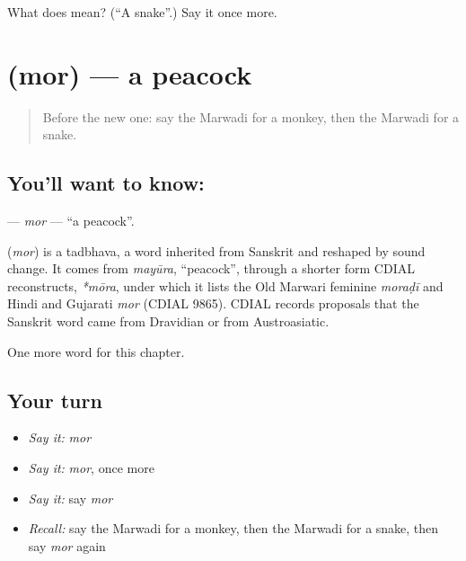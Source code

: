 \begin{tcolorbox}[breakable,colback=teal!4,colframe=teal!35!black,title={Before you move on}]
What does  mean? (\textquotedblleft{}A snake\textquotedblright{}.) Say it once more.
\end{tcolorbox}
\section[\texorpdfstring{\mw{मोर} (mor)}{मोर (mor)}]{ (mor) — a peacock}

\label{lesson:MW-C72-mor}



\begin{quote}
Before the new one: say the Marwadi for a monkey, then the Marwadi for a snake.
\end{quote}

\subsection*{You'll want to know: }
\textbf{} — \emph{mor} — \textquotedblleft{}a peacock\textquotedblright{}.

\begin{cousinweb}
\textbf{} (\emph{mor}) is a tadbhava, a word inherited from Sanskrit and reshaped by sound change. It comes from \emph{mayūra}, \textquotedblleft{}peacock\textquotedblright{}, through a shorter form CDIAL reconstructs, \emph{*mōra}, under which it lists the Old Marwari feminine \emph{moraḍī} and Hindi and Gujarati \emph{mor} (CDIAL 9865). CDIAL records proposals that the Sanskrit word came from Dravidian or from Austroasiatic.
\end{cousinweb}

\begin{grammarlens}[title={What you've built}]
One more word for this chapter.
\end{grammarlens}

\subsection*{Your turn}
\begin{itemize}
\raggedright
  \item \emph{Say it:} \emph{mor}
  \item \emph{Say it:} \emph{mor}, once more
  \item \emph{Say it:} say \emph{mor}
  \item \emph{Recall:} say the Marwadi for a monkey, then the Marwadi for a snake, then say \emph{mor} again
\end{itemize}


